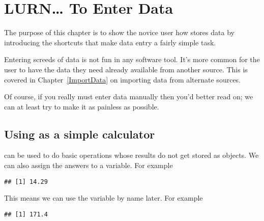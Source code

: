 \chapter{LURN\ldots{} To Enter Data} 
\label{DataEntry} 
 

 
The purpose of this chapter is to show the novice \R{} user how \R{} stores data by introducing the shortcuts that make data entry a fairly simple task. 
 
Entering screeds of data is not fun in any software tool. It's more common for the \R{} user to have the data they need already available from another source. This is covered in Chapter~\ref{ImportData} on importing data from alternate sources. 
 
Of course, if you really must enter data manually then you'd better read on; we can at least try to make it as painless as possible. 
 
\section{Using \R{} as a simple calculator} 
\label{SimpleCalculator} 
 
\R{} can be used to do basic operations whose results do not get stored as objects. We can also assign the answers to a variable. For example 
\begin{knitrout}
\color{fgcolor}\begin{kframe}
\begin{alltt}
\hlkwb{=}\hlopt{/}
\end{alltt}
\begin{verbatim}
## [1] 14.29
\end{verbatim}
\end{kframe}
\end{knitrout}
This means we can use the variable by name later. For example 
\begin{knitrout}
\color{fgcolor}\begin{kframe}
\begin{alltt}
\hlopt{*}
\end{alltt}
\begin{verbatim}
## [1] 171.4
\end{verbatim}
\end{kframe}
\end{knitrout}
 
